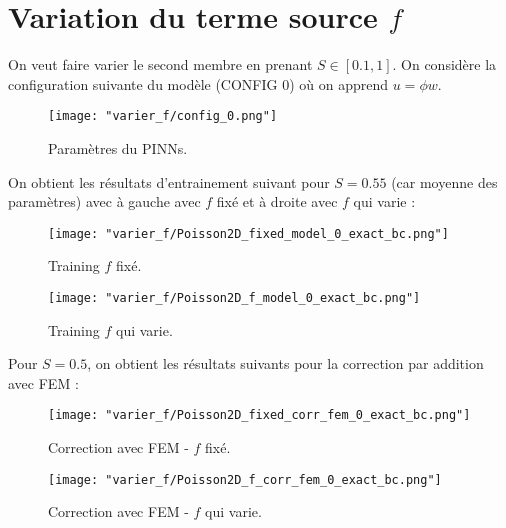 \section{Variation du terme source $f$}

On veut faire varier le second membre en prenant $S\in[0.1,1]$. On considère la configuration suivante du modèle (CONFIG 0) où on apprend $u=\phi w$.
	
\begin{figure}[H]
	\centering
	\texttt{[image: "varier\_f/config\_0.png"]}
	\caption{Paramètres du PINNs.}
	\label{config_0}
\end{figure}

On obtient les résultats d'entrainement suivant pour $S=0.55$ (car moyenne des paramètres) avec à gauche avec $f$ fixé et à droite avec $f$ qui varie :

\begin{minipage}{0.48\linewidth}
	\begin{figure}[H]
		\centering
		\texttt{[image: "varier\_f/Poisson2D\_fixed\_model\_0\_exact\_bc.png"]}
		\caption{Training $f$ fixé.}
		\label{Poisson2D_fixed_model_0_exact_bc}
	\end{figure}
\end{minipage}
\begin{minipage}{0.48\linewidth}
	\begin{figure}[H]
		\centering
		\texttt{[image: "varier\_f/Poisson2D\_f\_model\_0\_exact\_bc.png"]}
		\caption{Training $f$ qui varie.}
		\label{Poisson2D_f_model_0_exact_bc}
	\end{figure}
\end{minipage}

Pour $S=0.5$, on obtient les résultats suivants pour la correction par addition avec FEM :

\begin{minipage}{0.48\linewidth}
	\begin{figure}[H]
		\centering
		\texttt{[image: "varier\_f/Poisson2D\_fixed\_corr\_fem\_0\_exact\_bc.png"]}
		\caption{Correction avec FEM - $f$ fixé.}
		\label{Poisson2D_fixed_corr_fem_0_exact_bc}
	\end{figure}
\end{minipage}
\begin{minipage}{0.48\linewidth}
	\begin{figure}[H]
		\centering
		\texttt{[image: "varier\_f/Poisson2D\_f\_corr\_fem\_0\_exact\_bc.png"]}
		\caption{Correction avec FEM - $f$ qui varie.}
		\label{Poisson2D_f_corr_fem_0_exact_bc}
	\end{figure}
\end{minipage}

